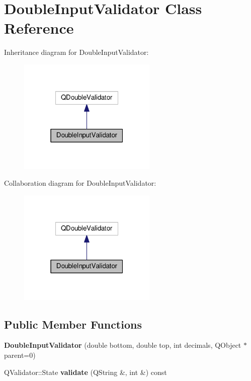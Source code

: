 \hypertarget{class_double_input_validator}{}\section{Double\+Input\+Validator Class Reference}
\label{class_double_input_validator}


Inheritance diagram for Double\+Input\+Validator\+:
\nopagebreak
\begin{figure}[H]
\begin{center}
\leavevmode
\includegraphics[width=187pt]{class_double_input_validator__inherit__graph}
\end{center}
\end{figure}


Collaboration diagram for Double\+Input\+Validator\+:
\nopagebreak
\begin{figure}[H]
\begin{center}
\leavevmode
\includegraphics[width=187pt]{class_double_input_validator__coll__graph}
\end{center}
\end{figure}
\subsection*{Public Member Functions}
\begin{DoxyCompactItemize}
\item 
{\bfseries Double\+Input\+Validator} (double bottom, double top, int decimals, Q\+Object $\ast$parent=0)\hypertarget{class_double_input_validator_a6619875c72078f7808e9535740564523}{}\label{class_double_input_validator_a6619875c72078f7808e9535740564523}

\item 
Q\+Validator\+::\+State {\bfseries validate} (Q\+String \&, int \&) const \hypertarget{class_double_input_validator_a653c2af396d2320e9c9f6da34e7f63da}{}\label{class_double_input_validator_a653c2af396d2320e9c9f6da34e7f63da}

\end{DoxyCompactItemize}


